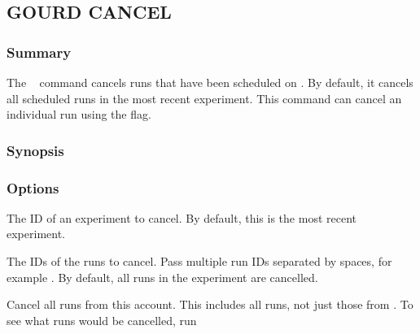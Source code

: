 \documentclass[a4paper,english]{article}
\begin{document}
\begin{adjustwidth}{18pt}{0pt}
%


    \subsection{GOURD CANCEL}

        \subsubsection{Summary}
            The ~ command cancels runs that have been scheduled on .
            By default, it cancels all scheduled runs in the most recent experiment.
            This command can cancel an individual run using the  flag.

        \subsubsection{Synopsis}

        \subsubsection{Options}
            \begin{Description}[Options]
                \item[\Arg{experiment-id}]
                The ID of an experiment to cancel.
                By default, this is the most recent experiment.
                \item[\OptArg{-i}{ run-ids}]
                The IDs of the runs to cancel.
                Pass multiple run IDs separated by spaces, for example .
                By default, all runs in the experiment are cancelled.
                \item[\oOpt{--all}]
                Cancel all runs from this account.
                This includes all runs, not just those from .
                To see what runs would be cancelled, run ~~~
            \end{Description}



\end{adjustwidth}
\end{document}
